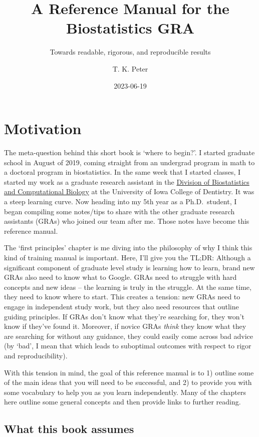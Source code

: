 \documentclass[
]{book}
\title{A Reference Manual for the Biostatistics GRA}
\subtitle{Towards readable, rigorous, and reproducible results}
\author{T. K. Peter}
\date{2023-06-19}
\begin{document}
\maketitle

{
\setcounter{tocdepth}{1}
\tableofcontents
}
\hypertarget{motivation}{%
\chapter{Motivation}\label{motivation}}

The meta-question behind this short book is `where to begin?'. I started graduate school in August of 2019, coming straight from an undergrad program in math to a doctoral program in biostatistics. In the same week that I started classes, I started my work as a graduate research assistant in the \href{https://dentistry.uiowa.edu/research/biostatistics-and-computational-biology}{Division of Biostatistics and Computational Biology} at the University of Iowa College of Dentistry. It was a steep learning curve. Now heading into my 5th year as a Ph.D.~student, I began compiling some notes/tips to share with the other graduate research assistants (GRAs) who joined our team after me. Those notes have become this reference manual.

The `first principles' chapter is me diving into the philosophy of why I think this kind of training manual is important. Here, I'll give you the TL;DR: Although a significant component of graduate level study is learning how to learn, brand new GRAs also need to know what to Google. GRAs need to struggle with hard concepts and new ideas -- the learning is truly in the struggle. At the same time, they need to know where to start. This creates a tension: new GRAs need to engage in independent study work, but they also need resources that outline guiding principles. If GRAs don't know what they're searching for, they won't know if they've found it. Moreover, if novice GRAs \emph{think} they know what they are searching for without any guidance, they could easily come across bad advice (by `bad', I mean that which leads to suboptimal outcomes with respect to rigor and reproducibility).

With this tension in mind, the goal of this reference manual is to 1) outline some of the main ideas that you will need to be successful, and 2) to provide you with some vocabulary to help you as you learn independently. Many of the chapters here outline some general concepts and then provide links to further reading.

\hypertarget{what-this-book-assumes}{%
\section{What this book assumes}\label{what-this-book-assumes}}
\end{document}
